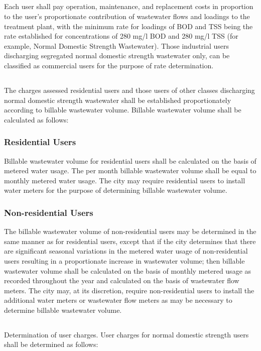 \subsection{}
Each user shall pay operation, maintenance, and replacement costs in proportion to the user’s proportionate contribution of wastewater flows and loadings to the treatment plant, with the minimum rate for loadings of BOD and TSS being the rate established for concentrations of 280 mg/l BOD and 280 mg/l TSS (for example, Normal Domestic Strength Wastewater).  Those industrial users discharging segregated normal domestic strength wastewater only, can be classified as commercial users for the purpose of rate determination.
\subsection{}
The charges assessed residential users and those users of other classes discharging normal domestic strength wastewater shall be established proportionately according to billable wastewater volume.  Billable wastewater volume shall be calculated as follows:
\subsubsection{Residential Users}
Billable wastewater volume for residential users shall be calculated on the basis of metered water usage.  The per month billable wastewater volume shall be equal to monthly metered water usage.  The city may require residential users to install water meters for the purpose of determining billable wastewater volume.
\subsubsection{Non-residential Users}
The billable wastewater volume of non-residential users may be determined in the same manner as for residential users, except that if the city determines that there are significant seasonal variations in the metered water usage of non-residential users resulting in a proportionate increase in wastewater volume; then billable wastewater volume shall be calculated on the basis of monthly metered usage as recorded throughout the year and calculated on the basis of wastewater flow meters.  The city may, at its discretion, require non-residential users to install the additional water meters or wastewater flow meters as may be necessary to determine billable wastewater volume.
\subsection{}
Determination of user charges.  User charges for normal domestic strength users shall be determined as follows:
